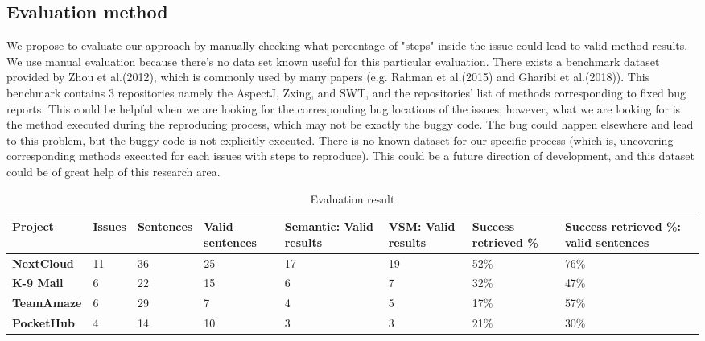 \documentclass[sigconf]{acmart}
\begin{document}
\subsection{Evaluation method}
We propose to evaluate our approach by manually checking what percentage of "steps" inside the issue could lead to valid method results. We use manual evaluation because there's no data set known useful for this particular evaluation.
There exists a benchmark dataset provided by Zhou et al.(2012)\cite{rvsm}, which is commonly used by many papers (e.g. Rahman et al.(2015)\cite{7488066} and Gharibi et al.(2018)\cite{original}). This benchmark contains 3 repositories namely the AspectJ, Zxing, and SWT, and the repositories' list of methods corresponding to fixed bug reports. This could be helpful when we are looking for the corresponding bug locations of the issues; however, what we are looking for is the method executed during the reproducing process, which may not be exactly the buggy code. The bug could happen elsewhere and lead to this problem, but the buggy code is not explicitly executed. There is no known dataset for our specific process (which is, uncovering corresponding methods executed for each issues with steps to reproduce). This could be a future direction of development, and this dataset could be of great help of this research area.
\begin{table*}[]
	\begin{tabular}{|p{2cm}|p{1cm}|p{1.3cm}|p{1.5cm}|p{2cm}|p{2cm}|p{1.5cm}|p{3cm}|}
		\hline
		\textbf{Project}            & \textbf{Issues} & \textbf{Sentences } & \textbf{Valid sentences} & \textbf{Semantic: Valid results}  & \textbf{VSM: Valid results} & \textbf{Success retrieved \%} & \textbf{Success retrieved \%: valid sentences}\\ \hline
		\textbf{NextCloud}          &  11 & 36&     25&     17&     19&     52\%     &76\%  \\ \hline
		\textbf{K-9 Mail}           &  6 &
22 &
15 &
6 &
7 &
32\% &
47\%
                  \\ \hline
		\textbf{TeamAmaze} &  6 &
29  &
7 &
4 &
5 &
17\% &
57\%
                   \\ \hline
		\textbf{PocketHub}          &  4 &
14 &
10 &
3 &
3 &
21\% &
30\% 
                   \\ \hline
	\end{tabular}
	\caption{Evaluation result}
	\label{table:evaluationResult}
\end{table*}
\end{document}
